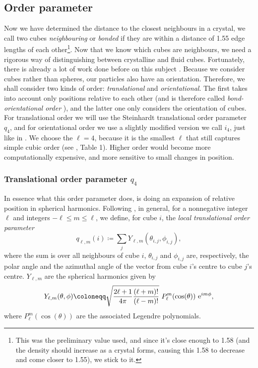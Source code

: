 \documentclass[thesis]{subfiles}
\begin{document}
\subsection{Order parameter}
Now we have determined the distance to the closest neighbours in a crystal, we call two cubes \emph{neighbouring} or \emph{bonded} if they are within a distance of 1.55 edge lengths of each other\footnote{This was the preliminary value used, and since it's close enough to 1.58 (and the density should increase as a crystal forms, causing this 1.58 to decrease and come closer to 1.55), we stick to it.}. Now that we know which cubes are neighbours, we need a rigorous way of distinguishing between crystalline and fluid cubes. Fortunately, there is already a lot of work done before on this subject \cite{steinhardt1983bond, lechner2008accurate, van2017phase, sharma2018disorder, mickel2013shortcomings}. Because we consider cubes rather than spheres, our particles also have an orientation. Therefore, we shall consider two kinds of order: \emph{translational} and \emph{orientational}. The first takes into account only positions relative to each other (and is therefore called \emph{bond-orientational order} \cite{steinhardt1983bond}), and the latter one only considers the orientation of cubes. For translational order we will use the Steinhardt translational order parameter \cite{steinhardt1983bond} $q_4$, and for orientational order we use a slightly modified version we call $i_4$, just like in \cite{sharma2018disorder}. We choose the $\ell = 4$, because it is the smallest $\ell$ that still captures simple cubic order (see \cite{mickel2013shortcomings}, Table 1). Higher order would become more computationally expensive, and more sensitive to small changes in position.

\subsubsection{Translational order parameter \texorpdfstring{$q_4$}{q4}}
In essence what this order parameter does, is doing an expansion of relative position in spherical harmonics. Following \cite{sharma2018disorder}, in general, for a nonnegative integer $\ell$ and integers $ -\ell \leq m \leq\ell$, we define, for cube $i$, the \emph{local translational order parameter}
\begin{equation}
	q_{\ell, m}(i) \coloneqq \sum_{j} Y_{\ell, m} (\theta_{i, j}, \phi_{i, j}),
\end{equation}
where the sum is over all neighbours of cube $i$, $\theta_{i, j}$ and $\phi_{i, j}$ are, respectively, the polar angle and the azimuthal angle of the vector from cube $i$'s centre to cube $j$'s centre. $Y_{\ell, m}$ are the spherical harmonics given by
\begin{equation}
	Y_{\ell, m}(\theta, \phi) \coloneqq \sqrt{\frac{2\ell + 1}{4\pi}\frac{(\ell + m)!}{(\ell - m)!}}\ P_\ell^m(\cos(\theta)) \ \me^{im\phi},
\end{equation}
where $P_\ell^m(\cos(\theta))$ are the associated Legendre polynomials. 
\end{document}
